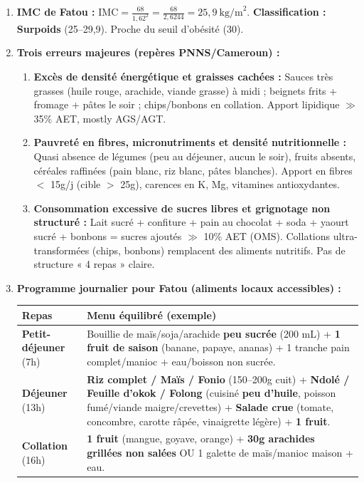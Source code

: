 \documentclass[11pt]{article}
\begin{document}
\begin{corrige}
\begin{enumerate}
\item \textbf{IMC de Fatou :}
$\text{IMC} = \frac{68}{1,62^2} = \frac{68}{2,6244} = 25,9\ \text{kg/m}^2$.
\textbf{Classification : Surpoids} (25--29,9). Proche du seuil d'obésité (30).
\item \textbf{Trois erreurs majeures (repères PNNS/Cameroun) :}
\begin{enumerate}
\item \textbf{Excès de densité énergétique et graisses cachées :} Sauces très grasses (huile rouge, arachide, viande grasse) à midi ; beignets frits + fromage + pâtes le soir ; chips/bonbons en collation. Apport lipidique $\gg$ 35\% AET, mostly AGS/AGT.
\item \textbf{Pauvreté en fibres, micronutriments et densité nutritionnelle :} Quasi absence de légumes (peu au déjeuner, aucun le soir), fruits absents, céréales raffinées (pain blanc, riz blanc, pâtes blanches). Apport en fibres $<$ 15g/j (cible $>$ 25g), carences en K, Mg, vitamines antioxydantes.
\item \textbf{Consommation excessive de sucres libres et grignotage non structuré :} Lait sucré + confiture + pain au chocolat + soda + yaourt sucré + bonbons = sucres ajoutés $\gg$ 10\% AET (OMS). Collations ultra-transformées (chips, bonbons) remplacent des aliments nutritifs. Pas de structure « 4 repas » claire.
\end{enumerate}
\item \textbf{Programme journalier pour Fatou (aliments locaux accessibles) :}
\begin{center}
\begin{tabularx}{\linewidth}{|l|X|}\hline
\textbf{Repas} & \textbf{Menu équilibré (exemple)} \\ \hline
\textbf{Petit-déjeuner} (7h) & Bouillie de maïs/soja/arachide \textbf{peu sucrée} (200 mL) + \textbf{1 fruit de saison} (banane, papaye, ananas) + 1 tranche pain complet/manioc + eau/boisson non sucrée. \\ \hline
\textbf{Déjeuner} (13h) & \textbf{Riz complet / Maïs / Fonio} (150--200g cuit) + \textbf{Ndolé / Feuille d'okok / Folong} (cuisiné \textbf{peu d'huile}, poisson fumé/viande maigre/crevettes) + \textbf{Salade crue} (tomate, concombre, carotte râpée, vinaigrette légère) + \textbf{1 fruit}. \\ \hline
\textbf{Collation} (16h) & \textbf{1 fruit} (mangue, goyave, orange) + \textbf{30g arachides grillées non salées} OU 1 galette de maïs/manioc maison + eau. \\ \hline

\end{tabularx}
\end{center}
\end{enumerate}
\end{corrige}
\end{document}
